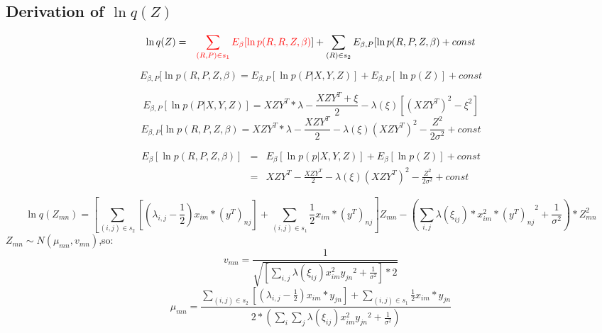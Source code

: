 \documentclass[11pt]{report}
\begin{document}
\subsection{Derivation of $\ln q(Z)$}

\begin{eqnarray*}
    \ln q(Z) 
    &=& \textcolor{red}{\sum_{(R,P)\in s_1}E_{\beta}[\ln p(R,R,Z,\beta)}] + \sum_{(R)\in s_2}E_{\beta,P}[\ln p(R,P,Z,\beta) + const %
\end{eqnarray*}

\begin{equation}
    E_{\beta,P}[\ln p(R,P,Z,\beta) = E_{\beta,P}[\ln p(P|X,Y,Z)]+E_{\beta,P}[\ln p(Z)]+const
\end{equation}

\begin{equation}
    E_{\beta,P}[\ln p(P|X,Y,Z)]=XZY^{T}*\lambda - \frac{XZY^{T}+\xi}{2}-\lambda(\xi)[(XZY^{T})^2-\xi^2]
\end{equation}
\begin{equation}
    E_{\beta,P}[\ln p(R,P,Z,\beta)= XZY^{T}*\lambda - \frac{XZY^{T}}{2}-\lambda(\xi)(XZY^{T})^2-\frac{Z^2}{2\sigma^2}+const
\end{equation}

\begin{eqnarray*}
E_{\beta}[\ln p(R,P,Z,\beta)] &=& E_{\beta}[\ln p(p|X,Y,Z)]+E_{\beta}[\ln p(Z)]+const \\
&=& XZY^{T} - \frac{XZY^{T}}{2}-\lambda(\xi)(XZY^{T})^2-\frac{Z^2}{2\sigma^2}+const
\end{eqnarray*}


\begin{equation}
    \ln q(Z_{mn})=[\sum_{(i,j)\in s_2}[(\lambda_{i,j}-\frac{1}{2})x_{im}*(y^{T})_{nj}]+\sum_{(i,j)\in s_1}\frac{1}{2}x_{im}*(y^{T})_{nj}]Z_{mn}-(\sum_{i,j}\lambda(\xi_{ij})*x^{2}_{im}*{(y^{T})_{nj}}^{2}+\frac{1}{\sigma^{2}})*Z^{2}_{mn}
\end{equation}
$Z_{mn}\sim N(\mu_{mn},v_{mn})$,so:
\begin{equation}
    v_{mn} = \frac{1}{\sqrt{[\sum_{i,j}\lambda(\xi_{ij})x^{2}_{im}{y_{jn}}^{2}+\frac{1}{\sigma^2}]*2}}
\end{equation}
\begin{equation}
    \mu_{mn} =\frac{\sum_{(i,j)\in s_2}[(\lambda_{i,j}-\frac{1}{2})x_{im}*y_{jn}]+\sum_{(i,j)\in s_1}\frac{1}{2}x_{im}*y_{jn}}{2*(\sum_{i}\sum_{j}\lambda(\xi_{ij})x^{2}_{im}{y_{jn}}^{2}+\frac{1}{\sigma^2})}
\end{equation}
\end{document}
